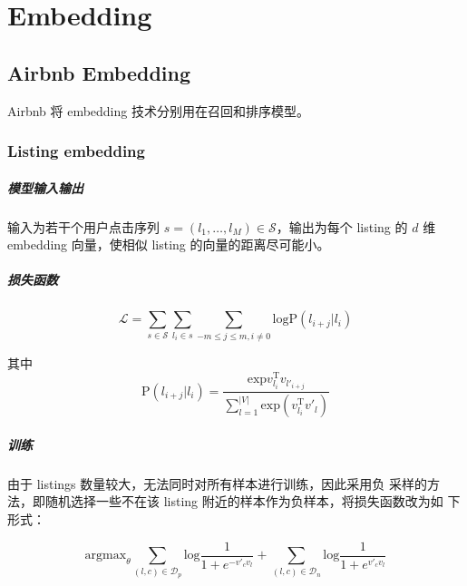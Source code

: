 \chapter{Embedding}
\section{Airbnb Embedding}
Airbnb 将 embedding 技术分别用在召回和排序模型。

\subsection{Listing embedding}
\paragraph{模型输入输出} 输入为若干个用户点击序列 $s=(l_1,\ldots,l_M) \in \mathcal{S}$，输出为每个
listing 的 $d$ 维 embedding 向量，使相似 listing 的向量的距离尽可能小。

\paragraph{损失函数}
\begin{equation}
  \mathcal{L} = \sum_{s \in \mathcal{S}} \sum_{l_i \in s} \sum_{-m \leq j \leq m, i \neq 0} \mathrm{log} \mathrm{P}(l_{i+j}|l_i)
\end{equation}

其中
\begin{equation}
  \mathrm{P}(l_{i+j}|l_i) = \frac{\mathrm{exp} v_{l_i}^{\mathrm{T}} v_{l'_{i+j}}}{\sum_{l=1}^{|V|}\mathrm{exp}(v_{l_i}^{\mathrm{T}} v'_l)}
\end{equation}

\paragraph{训练} 由于 listings 数量较大，无法同时对所有样本进行训练，因此采用负
采样的方法，即随机选择一些不在该 listing 附近的样本作为负样本，将损失函数改为如
下形式：

\begin{equation}
  \mathrm{argmax}_{\theta} \sum_{(l, c) \in \mathcal{D}_{p}} \mathrm{log} \frac{1}{1 + e^{-v'_c v_l}} + \sum_{(l, c) \in \mathcal{D}_{n}} \mathrm{log} \frac{1}{1 + e^{v'_c v_l}}
\end{equation}

